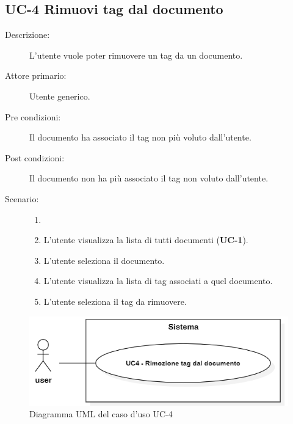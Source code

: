 \subsection{UC-4 Rimuovi tag dal documento}
\begin{description}
    \item[Descrizione:] L’utente vuole poter rimuovere un tag da un documento.
    \item[Attore primario:] Utente generico.
    \item[Pre condizioni:] Il documento ha associato il tag non più voluto dall’utente.
    \item[Post condizioni:] Il documento non ha più associato il tag non voluto dall’utente.
    \item[Scenario:]
    \begin{enumerate}
        \item[]
        \item L’utente visualizza la lista di tutti documenti (\textbf{UC-1}).
        \item L'utente seleziona il documento.
        \item L’utente visualizza la lista di tag associati a quel documento.
        \item L’utente seleziona il tag da rimuovere.
    \end{enumerate}
\end{description}

\begin{figure}[H]
    \centering
    \includegraphics[width=0.8\linewidth]{UC4.png} %
    \caption{Diagramma UML del caso d'uso UC-4}
    \label{fig:UC6}
\end{figure}

